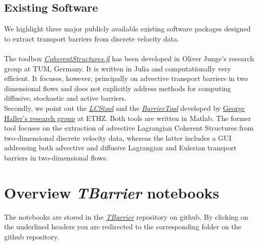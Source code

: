 \documentclass{article}
\begin{document}
\subsection{Existing Software}
We highlight three major publicly available existing software packages designed to extract transport barriers from discrete velocity data. \\ \\
The toolbox \textit{\href{https://coherentstructures.github.io/CoherentStructures.jl/stable/}{CoherentStructures.jl}} has been developed in Oliver Junge's research group at TUM, Germany. It is written in Julia and computationally very efficient. It focuses, however, principally on advective transport barriers in two dimensional flows and does not explicitly address methods for computing diffusive, stochastic and active barriers. \\ 

Secondly, we point out the \textit{\href{https://github.com/haller-group/LCStool}{LCStool}} and the \textit{\href{https://github.com/haller-group/BarrierTool}{BarrierTool}} developed by \href{http://georgehaller.com/}{George Haller's research group} at ETHZ. Both tools are written in Matlab. The former tool focuses on the extraction of advective Lagrangian Coherent Structures from two-dimensional discrete velocity data, whereas the latter includes a GUI addressing both advective and diffusive Lagrangian and Eulerian transport barriers in two-dimensional flows.

\section{Overview \textit{TBarrier} notebooks}
The notebooks are stored in the \href{https://github.com/EncinasBartos/TBarrier}{\textit{\underline{TBarrier}}} repository on github. By clicking on the underlined headers you are redirected to the corresponding folder on the github repository. \\ 
\end{document}
